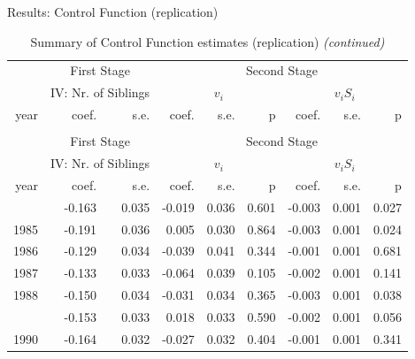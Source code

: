 \documentclass[10pt,ignorenonframetext,]{beamer}
\begin{document}
\begin{frame}{Results: Control Function (replication)}
\protect\hypertarget{results-control-function-replication}{}

\begingroup\fontsize{7}{9}\selectfont

\begin{longtable}[t]{rrrrrrrrr}
\caption{\label{tab:unnamed-chunk-4}Summary of Control Function estimates (replication)}\\
\toprule
\multicolumn{1}{c}{ } & \multicolumn{2}{c}{First Stage} & \multicolumn{6}{c}{Second Stage} \\
\cmidrule(l{2pt}r{2pt}){2-3} \cmidrule(l{2pt}r{2pt}){4-9}
\multicolumn{1}{c}{ } & \multicolumn{2}{c}{IV: Nr. of Siblings} & \multicolumn{3}{c}{$v_i$} & \multicolumn{3}{c}{$v_i S_i$} \\
\cmidrule(l{2pt}r{2pt}){2-3} \cmidrule(l{2pt}r{2pt}){4-6} \cmidrule(l{2pt}r{2pt}){7-9}
year & coef. & s.e. & coef. & s.e. & p & coef. & s.e. & p\\
\midrule
\endfirsthead
\caption[]{Summary of Control Function estimates (replication) \textit{(continued)}}\\
\toprule
\multicolumn{1}{c}{ } & \multicolumn{2}{c}{First Stage} & \multicolumn{6}{c}{Second Stage} \\
\cmidrule(l{2pt}r{2pt}){2-3} \cmidrule(l{2pt}r{2pt}){4-9}
\multicolumn{1}{c}{ } & \multicolumn{2}{c}{IV: Nr. of Siblings} & \multicolumn{3}{c}{$v_i$} & \multicolumn{3}{c}{$v_i S_i$} \\
\cmidrule(l{2pt}r{2pt}){2-3} \cmidrule(l{2pt}r{2pt}){4-6} \cmidrule(l{2pt}r{2pt}){7-9}
year & coef. & s.e. & coef. & s.e. & p & coef. & s.e. & p\\
\midrule
\endhead
\
\endfoot
\bottomrule
\endlastfoot
1984 & -0.163 & 0.035 & -0.019 & 0.036 & 0.601 & -0.003 & 0.001 & 0.027\\
1985 & -0.191 & 0.036 & 0.005 & 0.030 & 0.864 & -0.003 & 0.001 & 0.024\\
1986 & -0.129 & 0.034 & -0.039 & 0.041 & 0.344 & -0.001 & 0.001 & 0.681\\
1987 & -0.133 & 0.033 & -0.064 & 0.039 & 0.105 & -0.002 & 0.001 & 0.141\\
1988 & -0.150 & 0.034 & -0.031 & 0.034 & 0.365 & -0.003 & 0.001 & 0.038\\
\addlinespace
1989 & -0.153 & 0.033 & 0.018 & 0.033 & 0.590 & -0.002 & 0.001 & 0.056\\
1990 & -0.164 & 0.032 & -0.027 & 0.032 & 0.404 & -0.001 & 0.001 & 0.341\\

\end{longtable}
\end{frame}
\end{document}
